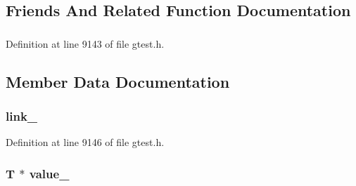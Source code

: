 \subsection{\-Friends \-And \-Related \-Function \-Documentation}
\hypertarget{classtesting_1_1internal_1_1linked__ptr_acca82c4f17b0013840df5f6b0723ea40}{
\subsubsection[{linked\-\_\-ptr}]{}}\label{d9/df4/classtesting_1_1internal_1_1linked__ptr_acca82c4f17b0013840df5f6b0723ea40}


\-Definition at line 9143 of file gtest.\-h.



\subsection{\-Member \-Data \-Documentation}
\hypertarget{classtesting_1_1internal_1_1linked__ptr_a2b30a3c114fd9671da7e1536eb91f496}{
\subsubsection[{link\-\_\-}]{ {\bf link\-\_\-}}}\label{d9/df4/classtesting_1_1internal_1_1linked__ptr_a2b30a3c114fd9671da7e1536eb91f496}


\-Definition at line 9146 of file gtest.\-h.

\hypertarget{classtesting_1_1internal_1_1linked__ptr_a4ddc1e6e173732d80915527e28056b48}{
\subsubsection[{value\-\_\-}]{\setlength{\rightskip}{0pt plus 5cm}\-T $\ast$ {\bf value\-\_\-}}}\label{d9/df4/classtesting_1_1internal_1_1linked__ptr_a4ddc1e6e173732d80915527e28056b48}


